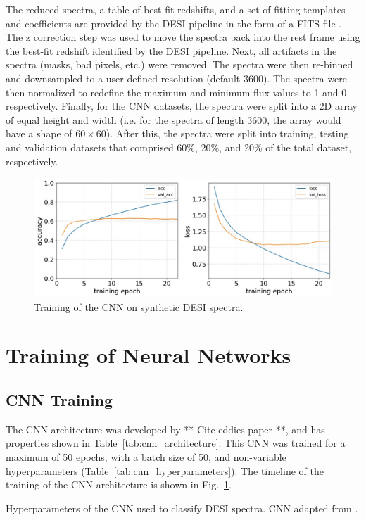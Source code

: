 The reduced spectra, a table of best fit redshifts, and a set of fitting templates and 
coefficients are provided by the DESI pipeline in the form of a FITS file \parencite{Pence2010, Guy2023}.
The z correction step was used to move the spectra back into the rest frame using 
the best-fit redshift identified by the DESI pipeline. Next, all artifacts 
in the spectra (masks, bad pixels, etc.) were removed. The spectra were then re-binned
and downsampled to a user-defined resolution (default 3600). The spectra were then
normalized to redefine the maximum and minimum flux values to 1 and 0 respectively. Finally, for the 
CNN datasets, the spectra were split into a 2D array of equal height and width 
(i.e. for the spectra of length 3600, the array would have a shape of $60\times60$). 
After this, the spectra were split into training, testing and validation datasets that 
comprised 60\%, 20\%, and 20\% of the total dataset, respectively.
\begin{figure}[t]
    \centering
    \includegraphics[width=.7\linewidth]{figures/cnn/cnn_training_history.jpg}
    \caption{Training of the CNN on synthetic DESI spectra.}
    \label{fig:cnn_training}
\end{figure}
\section{Training of Neural Networks}
\label{sec:training} 

\subsection{CNN Training}
\label{ssec:cnn_training}
The CNN architecture was developed by ** Cite eddies paper **, and has properties 
shown in Table~\ref{tab:cnn_architecture}.
This CNN was trained for a maximum of 50 epochs, with a batch size of 50, and 
non-variable hyperparameters (Table~\ref{tab:cnn_hyperparameters}). 
The timeline of the training of the CNN architecture is shown in Fig.~\ref{fig:cnn_training}.


\begin{table}[b]
    \small
    \centering
    \sffamily
    
    \caption{Hyperparameters of the CNN used to classify DESI spectra. CNN adapted 
    from \textcite{Sepeku2022}.}
    \label{tab:cnn_hyperparameters}
\end{table}


